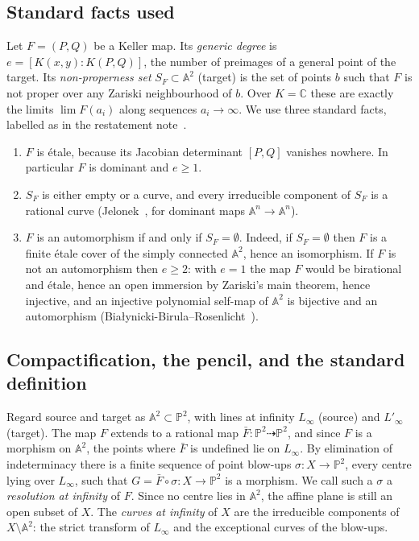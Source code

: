 \documentclass[a4paper,11pt]{article}
\theoremstyle{jsplain}
\theoremstyle{jsdef}
\theoremstyle{jsrem}
\begin{document}
\subsection{Standard facts used}

Let $F = (P,Q)$ be a Keller map. Its \emph{generic degree} is
$e = [K(x,y) : K(P,Q)]$, the number of preimages of a general point of the target. Its
\emph{non-properness set} $S_F \subset \mathbb{A}^2$ (target) is the set of points $b$ such
that $F$ is not proper over any Zariski neighbourhood of $b$. Over $K = \mathbb{C}$ these are
exactly the limits $\lim F(a_i)$ along sequences $a_i \to \infty$. We use three standard facts,
labelled as in the restatement note~\cite{Restatement}.
\begin{enumerate}[label=(F\arabic*),leftmargin=*]
\item $F$ is \'{e}tale, because its Jacobian determinant $[P,Q]$ vanishes nowhere. In
particular $F$ is dominant and $e \geq 1$.
\item $S_F$ is either empty or a curve, and every irreducible component of $S_F$ is a rational
curve (Jelonek~\cite{Jelonek1993}, for dominant maps $\mathbb{A}^n \to \mathbb{A}^n$).
\item $F$ is an automorphism if and only if $S_F = \emptyset$. Indeed, if $S_F = \emptyset$
then $F$ is a finite \'{e}tale cover of the simply connected $\mathbb{A}^2$, hence an
isomorphism. If $F$ is not an automorphism then $e \geq 2$: with $e = 1$ the map $F$ would be
birational and \'{e}tale, hence an open immersion by Zariski's main theorem, hence injective,
and an injective polynomial self-map of $\mathbb{A}^2$ is bijective and an automorphism
(Bia\l{}ynicki-Birula--Rosenlicht~\cite{BBR1962}).
\end{enumerate}

\subsection{Compactification, the pencil, and the standard definition}

Regard source and target as $\mathbb{A}^2 \subset \mathbb{P}^2$, with lines at infinity
$L_\infty$ (source) and $L'_\infty$ (target). The map $F$ extends to a rational map
$\bar{F} \colon \mathbb{P}^2 \dashrightarrow \mathbb{P}^2$, and since $F$ is a morphism on
$\mathbb{A}^2$, the points where $\bar F$ is undefined lie on $L_\infty$. By elimination of
indeterminacy there is a finite sequence of point blow-ups
$\sigma \colon X \to \mathbb{P}^2$, every centre lying over $L_\infty$, such that
$G = \bar{F} \circ \sigma \colon X \to \mathbb{P}^2$ is a morphism. We call such a $\sigma$ a
\emph{resolution at infinity} of $F$. Since no centre lies in $\mathbb{A}^2$, the affine plane
is still an open subset of $X$. The \emph{curves at infinity} of $X$ are the irreducible
components of $X \setminus \mathbb{A}^2$: the strict transform of $L_\infty$ and the exceptional
curves of the blow-ups.
\end{document}
